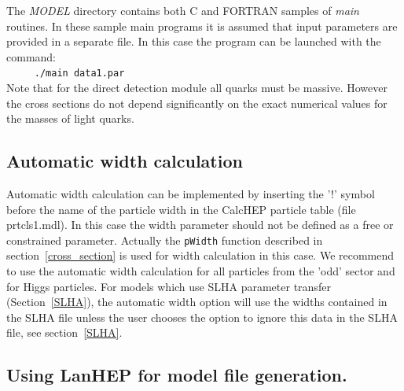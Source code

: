 \documentclass[12pt,a4paper]{article}
\begin{document}
The {\it MODEL} directory contains both  C and FORTRAN samples of {\it main}
routines. In these sample main programs it is assumed that input parameters are provided in a separate
file. In this case the  program can be launched with the command:\\
\verb|     ./main data1.par|\\
Note that for the direct detection module all quarks must be  massive. 
However the cross sections do not depend significantly on the exact  
numerical values for the masses of light quarks.

 
\subsection{Automatic width calculation}
Automatic width calculation can be 
implemented by  inserting the '!' symbol before the name of the particle width  in 
the CalcHEP particle table (file prtcls1.mdl). In this case the width parameter 
should not be defined as a free or constrained parameter. 
Actually the \verb|pWidth| function  described in section~\ref{cross_section} is  used for width calculation in this case.
We recommend to use the
automatic width calculation for all particles from the 'odd' sector and for
Higgs particles. 
For models which use SLHA parameter transfer (Section~\ref{SLHA}), 
the automatic width option will use the widths contained in the SLHA file unless the user chooses the option to
ignore this data in the SLHA file, see section~\ref{SLHA}. 


\subsection{Using LanHEP for model file generation.}
\end{document}
